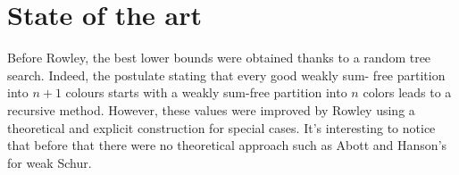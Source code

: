 \section{State of the art}

Before Rowley, the best lower bounds were obtained thanks to a random
tree search. Indeed, the postulate stating that every good weakly sum-
free partition into \(n+1\) colours starts with a weakly sum-free
partition into \(n\) colors leads to a recursive method. However,
these values were improved by Rowley using a theoretical and explicit
construction for special cases. It's interesting to notice that before
that there were no theoretical approach such as Abott and Hanson's
\cite{AbottHanson} for weak Schur.